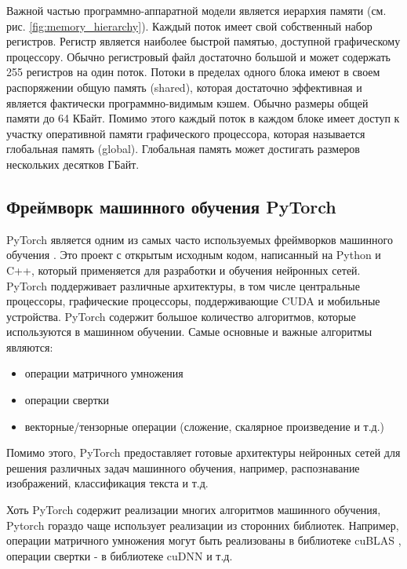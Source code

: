 Важной частью программно-аппаратной модели является иерархия памяти (см. рис. \ref{fig:memory_hierarchy}). Каждый поток имеет свой собственный
набор регистров. Регистр является наиболее быстрой памятью, доступной графическому процессору. Обычно регистровый файл достаточно большой и может
содержать 255 регистров на один поток. Потоки в пределах одного блока имеют в своем распоряжении общую память (shared), которая достаточно
эффективная и является фактически программно-видимым кэшем. Обычно размеры общей памяти до 64 КБайт. Помимо этого каждый поток в каждом блоке имеет
доступ к участку оперативной памяти графического процессора, которая называется глобальная память (global). Глобальная память может достигать
размеров нескольких десятков ГБайт.

\subsection{Фреймворк машинного обучения PyTorch}
PyTorch является одним из самых часто используемых фреймворков машинного обучения \cite{pytorch_2025}\cite{pytorch_review_2024}. Это проект с открытым исходным кодом,
написанный на Python и C++, который применяется для разработки и обучения нейронных сетей. PyTorch поддерживает различные архитектуры,
в том числе центральные процессоры, графические процессоры, поддерживающие CUDA и мобильные устройства.
PyTorch содержит большое количество алгоритмов, которые используются в машинном обучении. Самые основные и важные алгоритмы являются:
\begin{itemize}
    \item операции матричного умножения
    \item операции свертки
    \item векторные/тензорные операции (сложение, скалярное произведение и т.д.)
\end{itemize}
Помимо этого, PyTorch предоставляет готовые архитектуры нейронных сетей для решения различных задач машинного обучения, например,
распознавание изображений, классификация текста и т.д.

Хоть PyTorch содержит реализации многих алгоритмов машинного обучения, Pytorch гораздо чаще использует реализации из
сторонних библиотек. Например, операции матричного умножения могут быть реализованы в библиотеке
cuBLAS \cite{cublas_2025}, операции свертки - в библиотеке cuDNN \cite{cudnn_2025} и т.д.

